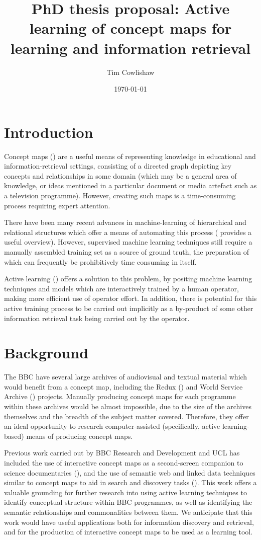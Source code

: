 \documentclass[a4paper, 11pt]{article}
\title{PhD thesis proposal: Active learning of concept maps for learning and information retrieval}
\author{Tim Cowlishaw}
\date{\today}
\begin{document}
\maketitle

\section{Introduction}
Concept maps (\cite{Novak2008a}) are a useful means of representing knowledge in educational and information-retrieval settings, consisting of a directed graph depicting key concepts and relationships in some domain (which may be a general area of knowledge, or ideas mentioned in a particular document or media artefact such as a television programme). However, creating such maps is a time-consuming process requiring expert attention.

There have been many recent advances in machine-learning of hierarchical and relational structures which offer a means of automating this process (\cite{Getoor2007} provides a useful overview). However, supervised machine learning techniques still require a manually assembled training set as a source of ground truth, the preparation of which can frequently be prohibitively time consuming in itself.

Active learning (\cite{Settles2012}) offers a solution to this problem, by positing machine learning techniques and models which are interactively trained by a human operator, making more efficient use of operator effort. In addition, there is potential for this active training process to be carried out implicitly as a by-product of some other information retrieval task being carried out by the operator.

\section{Background}
\label{sec:Background}
The BBC have several large archives of audiovisual and textual material which would benefit from a concept map, including the Redux (\cite{Butterworth2008}) and World Service Archive (\cite{Raimond}) projects. Manually producing concept maps for each programme within these archives would be almost impossible, due to the size of the archives themselves and the breadth of the subject matter covered. Therefore, they offer an ideal opportunity to research computer-assisted (specifically, active learning-based) means of producing concept maps.

Previous work carried out by BBC Research and Development and UCL has included the use of interactive concept maps as a second-screen companion to science documentaries (\cite{Dowell2014}), and the use of semantic web and linked data techniques similar to concept maps to aid in search and discovery tasks (\cite{Raimond2013}). This work offers a valuable grounding for further research into using active learning techniques to identify conceptual structure within BBC programmes, as well as identifying the semantic relationships and commonalities between them. We anticipate that this work would have useful applications both for information discovery and retrieval, and for the production of interactive concept maps to be used as a learning tool.
\end{document}
